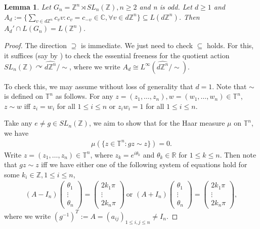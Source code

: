 \documentclass[12pt]{amsart}
\newtheorem{lem}[theorem]{Lemma}
\theoremstyle{definition}
\theoremstyle{remark}
\begin{document}
\begin{lem}\label{3.4}
Let $G_{n}=\mathbb{Z}^n \rtimes SL_n(\mathbb{Z}), n\ge 2$ and n is odd. Let $d\ge1$ and $A_{d}:=\{\sum_{v\in d\mathbb{Z}^{n}}c_{v}v:c_{v}=c_{-v}\in\mathbb{C},\forall v\in d\mathbb{Z}^{n}\}\subseteq L(d\mathbb{Z}^n)$. Then $A_d' \cap L(G_{n})=L(\mathbb{Z}^{n})$.
\end{lem}
\begin{proof}
The direction $\supseteq$ is immediate. We just need to check $\subseteq$ holds. For this, it suffices (say by \cite[Lemma 1.6]{packer}) to check the essential freeness for the quotient action $SL_{n}(\mathbb{Z})\curvearrowright\widehat{d\mathbb{Z}^{n}}/{\sim}$, where we write $A_d\cong L^{\infty}(\widehat{d\mathbb{Z}^n}/{\sim})$.

To check this, we may assume without loss of generality that $d = 1$. Note that $\sim$ is defined on $\mathbb{T}^n$ as follows. For any $z=(z_1,\ldots,z_n), w=(w_1,\ldots ,w_n)\in \mathbb{T}^n$,  $z\sim w$ iff $z_i=w_i$ for all $1\le i \le n$ or $z_iw_i=1$  for all $1\le i \le n$.

Take any $e\ne g\in SL_{n}(\mathbb{Z})$, we aim to show that for the Haar measure $\mu$ on $\mathbb{T}^n$, we have
\begin{align*}
        \mu(\{z\in \mathbb{T}^{n}:gz\sim z\})=0.
    \end{align*}
Write $z=(z_1,\ldots,z_n)\in \mathbb{T}^n$, where $z_{k} = e^{i\theta_{k}}$ and $\theta_k \in \mathbb{R}$ for $1\le k \le n$. Then 
note that $gz\sim z$ iff we have either one of the following system of equations hold for some $k_i\in \mathbb{Z}, 1\le i \le n$,
 \begin{align*}
        (A-I_{n})\begin{pmatrix}
            \theta_{1}\\
            \vdots\\
            \theta_{n}
        \end{pmatrix}=\begin{pmatrix}
            2k_{1}\pi\\
            \vdots\\
            2k_{n}\pi
        \end{pmatrix}~\text{or~}
        (A+I_{n})\begin{pmatrix}
            \theta_{1}\\
            \vdots\\
            \theta_{n}
        \end{pmatrix}=\begin{pmatrix}
            2k_{1}\pi\\
            \vdots\\
            2k_{n}\pi
            \end{pmatrix},
    \end{align*}
 where we write $(g^{-1})^{T}:=A=(a_{ij})_{1\le i,j\le n}\ne I_{n}$.    


\end{proof}
\end{document}
